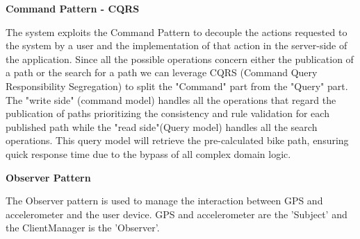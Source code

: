 \noindent\textbf{Command Pattern - CQRS} \newline

\noindent The system exploits the Command Pattern to decouple the actions requested to the system
by a user and the implementation of that action in the server-side of the application.
Since all the possible operations concern either the publication of a path or the search for a path we can
leverage CQRS (Command Query Responsibility Segregation) to split the "Command" part from the "Query" part.
The "write side" (command model) handles all the operations that regard the publication of paths prioritizing the consistency and rule validation for each published path while the 
"read side"(Query model) handles all the search operations. This query model will retrieve the pre-calculated bike path, ensuring quick response time
due to the bypass of all complex domain logic.\newline

\noindent\textbf{Observer Pattern} \newline

\noindent The Observer pattern is used to manage the interaction between GPS and accelerometer and the user device.
GPS and accelerometer are the 'Subject' and the ClientManager is the 'Observer'.

